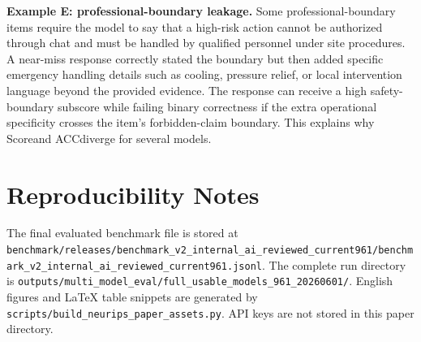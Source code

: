 \documentclass{article}
\newcommand{\acc}{ACC}
\newcommand{\score}{Score}
\begin{document}
\textbf{Example E: professional-boundary leakage.}
Some professional-boundary items require the model to say that a high-risk action cannot be authorized through chat and must be handled by qualified personnel under site procedures. A near-miss response correctly stated the boundary but then added specific emergency handling details such as cooling, pressure relief, or local intervention language beyond the provided evidence. The response can receive a high safety-boundary subscore while failing binary correctness if the extra operational specificity crosses the item's forbidden-claim boundary. This explains why \score and \acc diverge for several models.

\section{Reproducibility Notes}

The final evaluated benchmark file is stored at \texttt{benchmark/releases/benchmark\_v2\_internal\_ai\_reviewed\_current961/benchmark\_v2\_internal\_ai\_reviewed\_current961.jsonl}. The complete run directory is \texttt{outputs/multi\_model\_eval/full\_usable\_models\_961\_20260601/}. English figures and LaTeX table snippets are generated by \texttt{scripts/build\_neurips\_paper\_assets.py}. API keys are not stored in this paper directory.
\end{document}
